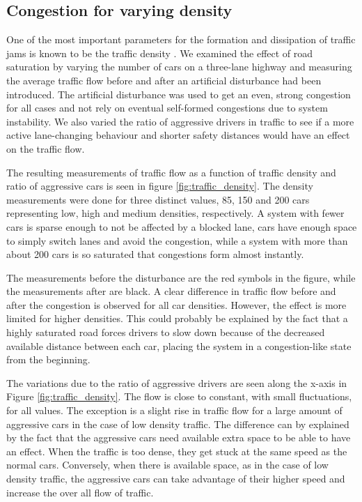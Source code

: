 \documentclass[11pt,a4paper,twocolumn]{article}
\begin{document}
 \subsection{Congestion for varying density}
 One of the most important parameters for the formation and dissipation of traffic jams is known to be the traffic density \cite{kerner96trafficjam, kerner97flow}. We examined the effect of road saturation by varying the number of cars on a three-lane highway and measuring the average traffic flow  before and after an artificial disturbance had been introduced. The artificial disturbance was used to get an even, strong congestion for all cases and not rely on eventual self-formed congestions due to system instability.  We also varied the ratio of aggressive drivers in traffic to see if a more active lane-changing behaviour and shorter safety distances would have an effect on the traffic flow.
 
 The resulting measurements of traffic flow as a function of traffic density and ratio of aggressive cars is seen in figure \ref{fig:traffic_density}. The density measurements were done for three distinct values, 85, 150 and 200 cars representing low, high and medium densities, respectively. A system with fewer cars is sparse enough to not be affected by a blocked lane, cars have enough space to simply switch lanes and avoid the congestion, while a system with more than about 200 cars is so saturated that congestions form almost instantly.
 
 The measurements before the disturbance are the red symbols in the figure, while the measurements after are black. A clear difference in traffic flow before and after the congestion is observed for all car densities. However, the effect is more limited for higher densities. This could probably be explained by the fact that a highly saturated road forces drivers to slow down because of the decreased available distance between each car, placing the system in a congestion-like state from the beginning.

 The variations due to the ratio of aggressive drivers are seen along the x-axis in Figure \ref{fig:traffic_density}. The flow is close to constant, with small fluctuations, for all values. The exception is a slight rise in traffic flow for a large amount of aggressive cars in the case of low density traffic. The difference can by explained by the fact that the aggressive cars need available extra space to be able to have an effect. When the traffic is too dense, they get stuck at the same speed as the normal cars. Conversely, when there is available space, as in the case of low density traffic, the aggressive cars can take advantage of their higher speed and increase the over all flow of traffic.
\end{document}
